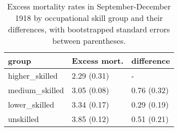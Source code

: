\begin{table}

\caption{\label{tab:lab:emr_byskill_boot}Excess mortality rates in September-December 1918 by occupational skill group and their differences, with bootstrapped standard errors between parentheses.}
\centering
\begin{tabular}[t]{l|l|l}
\hline
group & Excess mort. & difference\\
\hline
higher\_skilled & 2.29 (0.31) & -\\
\hline
medium\_skilled & 3.05 (0.08) & 0.76 (0.32)\\
\hline
lower\_skilled & 3.34 (0.17) & 0.29 (0.19)\\
\hline
unskilled & 3.85 (0.12) & 0.51 (0.21)\\
\hline
\end{tabular}
\end{table}

